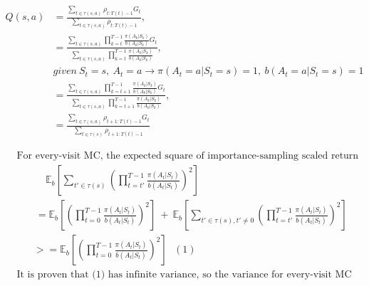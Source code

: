 \documentclass{article}
\begin{document}

\[
  \begin{aligned}
    Q(s, a) &= \frac {\sum_{t\in\tau(s, a)} \rho_{t:T(t)-1}G_{t}}
                     {\sum_{t\in\tau(s, a)} \rho_{t:T(t)-1}}, \\
    &=  \frac {\sum_{t\in\tau(s,a)} \prod_{k=t}^{T-1} \frac {\pi(A_k|S_k)} {b(A_k|S_k)} G_{t}}
              {\sum_{t\in\tau(s,a)} \prod_{k=t}^{T-1} \frac {\pi(A_k|S_k)} {b(A_k|S_k)} },\\
    & given \ S_t = s, \ A_t=a  \rightarrow  \pi(A_t=a|S_t=s)=1, \ b(A_t=a|S_t=s)=1 \\
    &=  \frac {\sum_{t\in\tau(s,a)} \prod_{k=t+1}^{T-1} \frac {\pi(A_k|S_k)} {b(A_k|S_k)} G_{t}}
              {\sum_{t\in\tau(s,a)} \prod_{k=t+1}^{T-1} \frac {\pi(A_k|S_k)} {b(A_k|S_k)} }, \\
    &= \frac {\sum_{t\in\tau(s,a)} \rho_{t+1:T(t)-1}G_{t}} {\sum_{t\in\tau(s)} \rho_{t+1:T(t)-1}}
  \end{aligned}
\]

\[
  \begin{aligned}
    &\text{ For every-visit MC, the expected square of importance-sampling scaled return for a state s is: } \\
    &\qquad \quad\ \mathbb{E}_b[\sum_{t'\in\tau(s)}(\prod_{t=t'}^{T-1} \frac {\pi(A_t|S_t)} {b(A_t|S_t)})^2]\\
    &\qquad \ = \mathbb{E}_b[(\prod_{t=0}^{T-1} \frac {\pi(A_t|S_t)} {b(A_t|S_t)})^2] \ + \
                \mathbb{E}_b[\sum_{t'\in\tau(s), t'\not=0}(\prod_{t=t'}^{T-1} \frac {\pi(A_t|S_t)} {b(A_t|S_t)})^2]\\
    &\qquad >=  \mathbb{E}_b[(\prod_{t=0}^{T-1} \frac {\pi(A_t|S_t)} {b(A_t|S_t)})^2] \ \ \ (1) \\
    &\text{ It is proven that (1) has infinite variance, so the variance for every-visit MC estimator is still infinite.} \\
  \end{aligned}
\]
\end{document}

